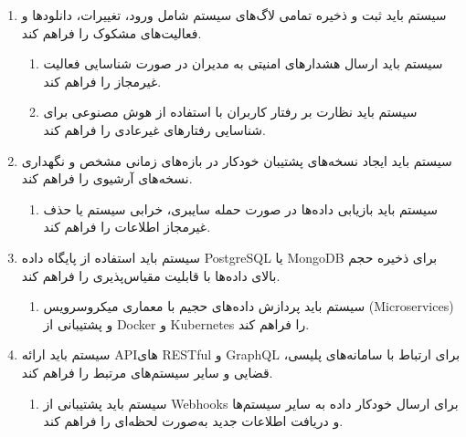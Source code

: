 \documentclass[12pt,a4paper,oneside]{article}
\begin{document}
\begin{itemize}
\begin{enumerate}
            \item 
            سیستم باید ثبت و ذخیره تمامی لاگ‌های سیستم شامل ورود، تغییرات، دانلودها و فعالیت‌های مشکوک را فراهم کند.
            \begin{enumerate}
                \renewcommand{\labelenumii}{{\rl{\arabic{enumii}.\arabic{enumi}}}R-}
                \item 
                سیستم باید ارسال هشدارهای امنیتی به مدیران در صورت شناسایی فعالیت غیرمجاز را فراهم کند.
                \item 
                سیستم باید نظارت بر رفتار کاربران با استفاده از هوش مصنوعی برای شناسایی رفتارهای غیرعادی را فراهم کند.
            \end{enumerate}
    
            \item 
            سیستم باید ایجاد نسخه‌های پشتیبان خودکار در بازه‌های زمانی مشخص و نگهداری نسخه‌های آرشیوی را فراهم کند.
            \begin{enumerate}
                \renewcommand{\labelenumii}{{\rl{\arabic{enumii}.\arabic{enumi}}}R-}
                \item 
                سیستم باید بازیابی داده‌ها در صورت حمله سایبری، خرابی سیستم یا حذف غیرمجاز اطلاعات را فراهم کند.
            \end{enumerate}
    
            \item 
            سیستم باید استفاده از پایگاه داده PostgreSQL یا MongoDB برای ذخیره حجم بالای داده‌ها با قابلیت مقیاس‌پذیری را فراهم کند.
            \begin{enumerate}
                \renewcommand{\labelenumii}{{\rl{\arabic{enumii}.\arabic{enumi}}}R-}
                \item 
                سیستم باید پردازش داده‌های حجیم با معماری میکروسرویس (Microservices) و پشتیبانی از Docker و Kubernetes را فراهم کند.
            \end{enumerate}
    
            \item 
            سیستم باید ارائه APIهای RESTful و GraphQL برای ارتباط با سامانه‌های پلیسی، قضایی و سایر سیستم‌های مرتبط را فراهم کند.
            \begin{enumerate}
                \renewcommand{\labelenumii}{{\rl{\arabic{enumii}.\arabic{enumi}}}R-}
                \item 
                سیستم باید پشتیبانی از Webhooks برای ارسال خودکار داده به سایر سیستم‌ها و دریافت اطلاعات جدید به‌صورت لحظه‌ای را فراهم کند.
            \end{enumerate}
    

\end{enumerate}
\end{itemize}
\end{document}
